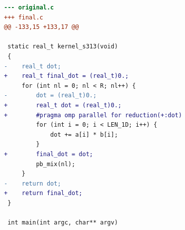\begin{lstlisting}[language=diff,basicstyle=\ttfamily\scriptsize,breaklines=true,caption={tsvc/s313 — FASTER (e1_a)}]
--- original.c
+++ final.c
@@ -133,15 +133,17 @@
 
 static real_t kernel_s313(void)
 {
-    real_t dot;
+    real_t final_dot = (real_t)0.;
     for (int nl = 0; nl < R; nl++) {
-        dot = (real_t)0.;
+        real_t dot = (real_t)0.;
+        #pragma omp parallel for reduction(+:dot) 
         for (int i = 0; i < LEN_1D; i++) {
             dot += a[i] * b[i];
         }
+        final_dot = dot;
         pb_mix(nl);
     }
-    return dot;
+    return final_dot;
 }
 
 int main(int argc, char** argv)
\end{lstlisting}
